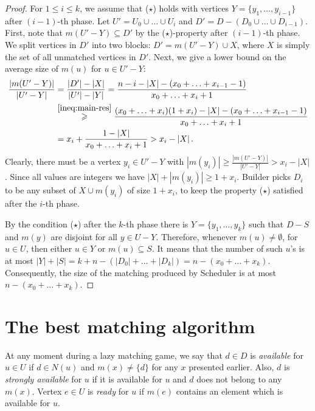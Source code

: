 \documentclass[12pt]{amsart}
\renewcommand{\leq}{\leqslant}
\renewcommand{\geq}{\geqslant}
\theoremstyle{definition}
\newcommand{\abs}[1]{\left\vert#1\right\vert}
\newcommand{\Br}{Builder\xspace}
\newcommand{\Sr}{Scheduler\xspace}
\begin{document}
\begin{proof}
For $1\leq i\leq k$, we assume that ($\star$) holds with vertices $Y=\{y_1,\ldots,y_{i-1}\}$ after $(i-1)$-th phase.
Let $U'=U_0\cup\ldots\cup U_{i}$ and $D'=D-(D_0\cup\ldots\cup D_{i-1})$.
First, note that $m(U'-Y)\subseteq D'$ by the ($\star$)-property after $(i-1)$-th phase.
We split vertices in $D'$ into two blocks:
$D' = m(U'-Y)\cup X$, where $X$ is simply the set of all unmatched vertices in $D'$.
Next, we give a lower bound on the average size of $m(u)$ for $u\in U'-Y$:
\begin{align*}
\frac{\abs{m(U'-Y)}}{\abs{U'-Y}} &=
    \frac{\abs{D'}-\abs{X}}{\abs{U'}-\abs{Y}}  
    =\frac{n-i-\abs{X}-(x_0+\ldots+x_{i-1}-1)}{x_0+\ldots+x_i+1}\\
    &\buildrel \eqref{ineq:main-res}\over \geq \frac{(x_0+\ldots+x_i)(1+x_i)-\abs{X}-(x_0+\ldots+x_{i-1}-1)}{x_0+\ldots+x_i+1}\\
    &= x_i + \frac{1-\abs{X}}{x_0+\ldots+x_i+1} > x_i - \abs{X}.
  \end{align*}
Clearly, there must be a vertex $y_i\in U'-Y$ with $\abs{m(y_i)}\geq \frac{\abs{m(U'-Y)}}{\abs{U'-Y}} > x_i-\abs{X}$.
Since all values are integers we have $\abs{X}+\abs{m(y_i)}\geq 1 + x_i$.
\Br picks $D_i$  to be any subset of $X\cup m(y_i)$ of size $1+x_i$,  to keep the property ($\star$) satisfied after the $i$-th phase.

By the condition ($\star$) after the $k$-th phase there is $Y=\{y_1,\ldots, y_k\}$ such that  $D-S$ and $m(y)$ are disjoint for all $y\in U-Y$.
Therefore, whenever $m(u)\neq\emptyset$,  for $u\in U$, then either $u\in Y$ or $m(u)\subseteq S$. 
It means that the number of such $u$'s is at most $\abs{Y}+\abs{S} = k + n - (\abs{D_0}+\ldots+\abs{D_k}) = n-(x_0+\ldots+x_k)$. 
Consequently, the size of the matching produced by  \Sr is at most $n-(x_0+\ldots+x_k)$.
\end{proof}

\section{The best matching algorithm}
\label{sect:best_alg}


At any moment during a lazy matching game, we say that $d\in D$ is \emph{available} for $u\in U$ if $d\in N(u)$ and $m(x)\neq\{d\}$ for any $x$ presented earlier.
Also, $d$ is \emph{strongly available} for $u$ if it is available for $u$ and $d$ does not belong to any $m(x)$. 
Vertex $e\in U$ is \emph{ready} for $u$ if $m(e)$ contains an  element which is available for $u$.
\end{document}
